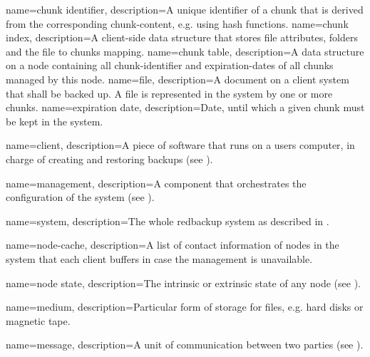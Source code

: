 {
    name={chunk identifier},
    description={A unique identifier of a \gls{chunk} that is derived from the corresponding \gls{chunk-content}, e.g. using hash functions.}
}
{
    name={chunk index},
    description={A \gls{client}-side data structure that stores file attributes, folders and the file to \glspl{chunk} mapping.}
}
{
    name={chunk table},
    description={A data structure on a \gls{node} containing all \gls{chunk-identifier} and \glspl{expiration-date} of all \glspl{chunk} managed by this \gls{node}.}
}
{
    name={file},
    description={A document on a client system that shall be backed up. A file is represented in the system by one or more \glspl{chunk}.}
}
{
    name={expiration date},
    description={Date, until which a given \gls{chunk} must be kept in the system.}
}

{
    name={client},
    description={A piece of software that runs on a users computer, in charge of creating and restoring backups (see ).}
}

{
    name={management},
    description={A component that orchestrates the configuration of the system (see ).}
}

{
    name={system},
    description={The whole redbackup system as described in .}
}

{
    name={node-cache},
    description={A list of contact information of nodes in the system that each client buffers in case the management is unavailable.}
}

{
    name={node state},
    description={The intrinsic or extrinsic state of any node (see ).}
}

{
    name={medium},
    description={Particular form of storage for files, e.g. hard disks or magnetic tape.}
}

{
    name={message},
    description={A unit of communication between two parties (see ).}
}

